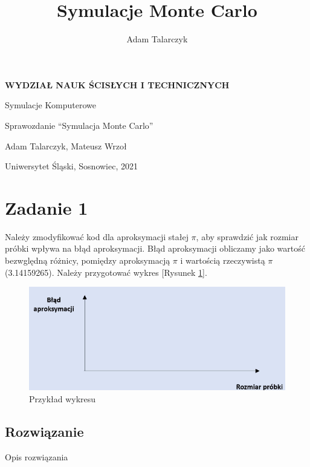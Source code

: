 \documentclass[a4paper,11pt,titlepage]{article}
\author{Adam Talarczyk}
\title{Symulacje Monte Carlo}
\begin{document}
\begin{titlepage}
    \begin{center}

        \Huge
        \textbf{WYDZIAŁ NAUK ŚCISŁYCH I TECHNICZNYCH}
        
        
        \vspace{1.5cm}
	   Symulacje Komputerowe
        \LARGE
        
	\vspace{2cm}
	
	Sprawozdanie ``Symulacja Monte Carlo''

	\vspace{1cm}
	Adam Talarczyk, Mateusz Wrzoł
	
	\vspace{5cm}
        \vfill

        \vspace{0.8cm}
	\Large
        Uniwersytet Śląski, Sosnowiec, 2021

    \end{center}
\end{titlepage}
\newpage



\section{Zadanie 1}
Należy zmodyfikować kod dla aproksymacji stałej $\pi$, aby sprawdzić jak rozmiar próbki wpływa na błąd aproksymacji. Błąd aproksymacji obliczamy jako wartość bezwględną różnicy, pomiędzy aproksymacją $\pi$ i wartością rzeczywistą $\pi$ (3.14159265). Należy przygotować wykres [Rysunek \ref{fig:wykres1}].

\begin{figure}[H]
\centering
\includegraphics[width=1\columnwidth]{img/zad1.PNG}
\caption{Przykład wykresu}
\label{fig:wykres1}
\end{figure}

\subsection{Rozwiązanie}
Opis rozwiązania
\end{document}
